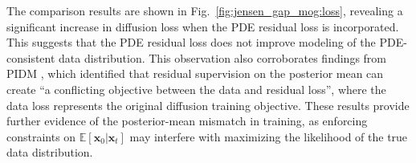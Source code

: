 \documentclass{article}
\theoremstyle{plain}
\theoremstyle{definition}
\theoremstyle{remark}
\def\cN{{\mathcal{N}}}
\def\vv{{\bm{v}}}
\def\vx{{\bm{x}}}
\newcommand{\E}{\mathbb{E}}
\begin{document}
The comparison results are shown in Fig.~\ref{fig:jensen_gap_mog:loss}, revealing a significant increase in diffusion loss when the PDE residual loss is incorporated. This suggests that the PDE residual loss does not improve modeling of the PDE-consistent data distribution. This observation also corroborates findings from PIDM \cite{bastek2025pdim}, which identified that residual supervision on the posterior mean can create ``a conflicting objective between the data and residual loss'', where the data loss represents the original diffusion training objective. These results provide further evidence of the posterior-mean mismatch in training, as enforcing constraints on $\mathbb{E}[\vx_0 | \vx_t]$ may interfere with maximizing the likelihood of the true data distribution.

\end{document}
